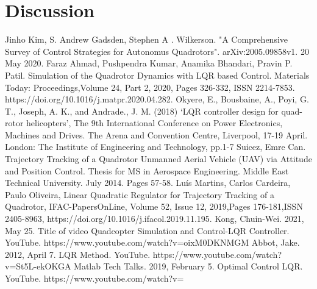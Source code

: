 \documentclass{article}
\begin{document}
\section*{Discussion}

\label{References}

\begin{thebibliography}{10}
Jinho Kim, S. Andrew Gadsden, Stephen A . Wilkerson.
"A Comprehensive Survey of Control Strategies for Autonomus Quadrotors".
arXiv:2005.09858v1.
20 May 2020.
Faraz Ahmad, Pushpendra Kumar, Anamika Bhandari, Pravin P. Patil.
Simulation of the Quadrotor Dynamics with LQR based Control.
Materials Today: Proceedings,Volume 24, Part 2, 2020, Pages 326-332,
ISSN 2214-7853.
https://doi.org/10.1016/j.matpr.2020.04.282.
Okyere, E., Bousbaine, A., Poyi, G. T., Joseph, A. K., and Andrade.,
J. M. (2018) ‘LQR controller design for quad-rotor helicopters’,
The 9th International Conference on Power Electronics, Machines
and Drives. The Arena and Convention Centre, Liverpool, 17-19
April. London: The Institute of Engineering and Technology, pp.1-7
Suicez, Emre Can.  Trajectory Tracking of a Quadrotor Unmanned Aerial Vehicle (UAV) via Attitude and Position Control.  Thesis for MS in Aerospace Engineering.  Middle East Technical University. July 2014. Pages 57-58.
Luís Martins, Carlos Cardeira, Paulo Oliveira,
Linear Quadratic Regulator for Trajectory Tracking of a Quadrotor,
IFAC-PapersOnLine,
Volume 52, Issue 12, 2019,Pages 176-181,ISSN 2405-8963,
https://doi.org/10.1016/j.ifacol.2019.11.195.
Kong, Chuin-Wei.  2021, May 25. Title of video Quadcopter Simulation and Control-LQR Controller. YouTube. https://www.youtube.com/watch?v=oixM0DKNMGM
Abbot, Jake. 2012, April 7. LQR Method. YouTube. https://www.youtube.com/watch?v=St5L-ekOKGA
Matlab Tech Talks. 2019, February 5. Optimal Control LQR. YouTube. https://www.youtube.com/watch?v=


\end{thebibliography}

\end{document}
